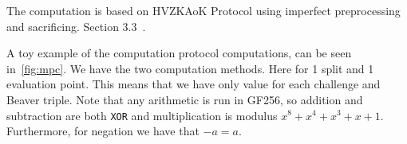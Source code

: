 \documentclass[11pt]{report}
\theoremstyle{definition}
\theoremstyle{plain}
\begin{document}
The computation is based on HVZKAoK Protocol using imperfect preprocessing and sacrificing. Section 3.3~\cite{baum2020concretely}.

A toy example of the computation protocol computations, can be seen in~\autoref{fig:mpc}. We have the two computation methods. Here for 1 split and 1 evaluation point. This means that we have only value for each challenge and Beaver triple. Note that any arithmetic is run in GF256, so addition and subtraction are both \texttt{XOR} and multiplication is modulus $x^8 + x^4 + x^3 + x + 1$. Furthermore, for negation we have that $-a = a$.

\begin{figure}[H]
\end{figure}
\end{document}
